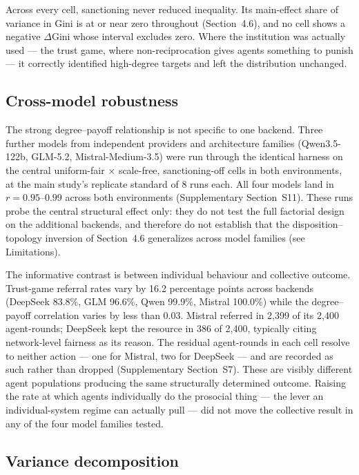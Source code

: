 \documentclass[11pt,a4paper]{article}
\begin{document}
Across every cell, sanctioning never reduced inequality. Its
main-effect share of variance in Gini is at or near zero throughout
(Section~4.6), and no cell shows a negative $\Delta$Gini whose
interval excludes zero. Where the institution was actually used ---
the trust game, where non-reciprocation gives agents something to
punish --- it correctly identified high-degree targets and left the
distribution unchanged.

\subsection{Cross-model robustness}

The strong degree--payoff relationship is not specific to one backend.
Three further models from
independent providers and architecture families (Qwen3.5-122b,
GLM-5.2, Mistral-Medium-3.5) were run through the identical harness
on the central uniform-fair $\times$ scale-free, sanctioning-off cells
in both environments, at the main study's replicate standard of 8 runs
each. All four models land in
$r=0.95$--$0.99$ across both environments (Supplementary
Section~S11). These runs probe the central structural effect only:
they do not test the full factorial design on the additional backends,
and therefore do not establish that the disposition--topology
inversion of Section~4.6 generalizes across model families
(see Limitations).

The informative contrast is between individual behaviour and
collective outcome. Trust-game referral rates vary by 16.2 percentage
points across backends (DeepSeek 83.8\%, GLM 96.6\%, Qwen 99.9\%,
Mistral 100.0\%) while the degree--payoff correlation varies by less
than $0.03$. Mistral referred in 2,399 of its 2,400 agent-rounds;
DeepSeek kept the resource in 386 of 2,400, typically citing
network-level fairness as its reason. The residual agent-rounds in
each cell resolve to neither action --- one for Mistral, two for
DeepSeek --- and are recorded as such rather than dropped
(Supplementary Section~S7). These are visibly different
agent populations producing the same structurally determined outcome.
Raising the rate at which agents individually do the prosocial
thing --- the lever an individual-system regime can actually pull ---
did not move the collective result in any of the four model families
tested.

\subsection{Variance decomposition}
\end{document}

